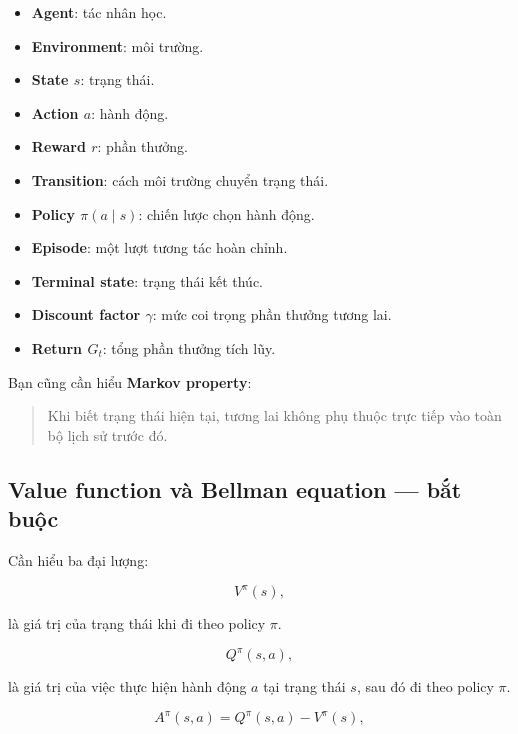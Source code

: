 \documentclass[12pt,a4paper]{article}
\begin{document}
\begin{itemize}[leftmargin=1.5em]
    \item \textbf{Agent}: tác nhân học.
    \item \textbf{Environment}: môi trường.
    \item \textbf{State $s$}: trạng thái.
    \item \textbf{Action $a$}: hành động.
    \item \textbf{Reward $r$}: phần thưởng.
    \item \textbf{Transition}: cách môi trường chuyển trạng thái.
    \item \textbf{Policy $\pi(a\mid s)$}: chiến lược chọn hành động.
    \item \textbf{Episode}: một lượt tương tác hoàn chỉnh.
    \item \textbf{Terminal state}: trạng thái kết thúc.
    \item \textbf{Discount factor $\gamma$}: mức coi trọng phần thưởng tương lai.
    \item \textbf{Return $G_t$}: tổng phần thưởng tích lũy.
\end{itemize}

Bạn cũng cần hiểu \textbf{Markov property}:

\begin{quote}
Khi biết trạng thái hiện tại, tương lai không phụ thuộc trực tiếp vào toàn bộ lịch sử trước đó.
\end{quote}

\subsection{Value function và Bellman equation --- bắt buộc}

Cần hiểu ba đại lượng:

\begin{equation}
V^\pi(s),
\end{equation}

là giá trị của trạng thái khi đi theo policy $\pi$.

\begin{equation}
Q^\pi(s,a),
\end{equation}

là giá trị của việc thực hiện hành động $a$ tại trạng thái $s$, sau đó đi theo policy $\pi$.

\begin{equation}
A^\pi(s,a)=Q^\pi(s,a)-V^\pi(s),
\end{equation}
\end{document}
